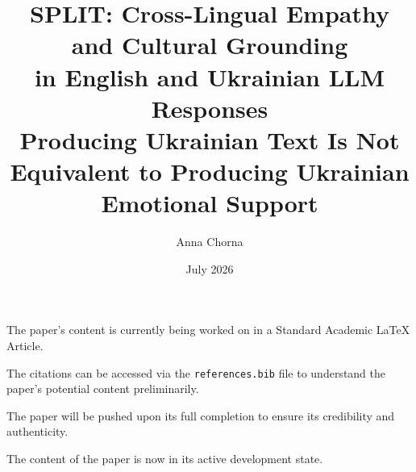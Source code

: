 \documentclass[11pt,a4paper]{article}
\begin{document}
\title{
SPLIT: Cross-Lingual Empathy and Cultural Grounding\\
in English and Ukrainian LLM Responses\\[0.7em]
\normalsize
{Producing Ukrainian Text Is Not Equivalent to Producing Ukrainian Emotional Support}
}
\author{Anna Chorna}
\date{July 2026}

The paper's content is currently being worked on in a Standard Academic LaTeX Article.

The citations can be accessed via the \texttt{references.bib} file to understand the paper's potential content preliminarily.

The paper will be pushed upon its full completion to ensure its credibility and authenticity.

The content of the paper is now in its active development state.
\end{document}
